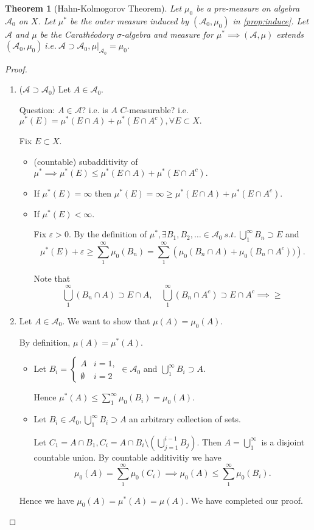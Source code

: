 \documentclass{report}
\newcommand{\st}{\ s.t.\ }
\newcommand{\ie}{\ i.e.\ }
\newtheorem{theorem}{Theorem}[chapter]
\theoremstyle{definition}
\theoremstyle{remark}
\begin{document}
\begin{theorem}[Hahn-Kolmogorov Theorem]
Let $\mu_0$ be a pre-measure on algebra $\mathcal{A}_0$ on $X$. Let $\mu^*$ be the outer measure induced by $(\mathcal{A}_0, \mu_0)$ in \ref{prop:induce}. Let $\mathcal{A}$ and $\mu$ be the Carathéodory $\sigma$-algebra and measure for $\mu^* \implies (\mathcal{A}, \mu)$ extends $(\mathcal{A}_0, \mu_0) \ie \mathcal{A} \supset \mathcal{A}_0, \mu|_{\mathcal{A}_0} = \mu_0.$ 
\end{theorem}
\begin{proof}
\begin{enumerate}
\item ($\mathcal{A} \supset \mathcal{A}_0$)
Let $A \in \mathcal{A}_0$. 

Question: $A \in \mathcal{A}$? i.e. is $A$ $C$-measurable? i.e. $\mu^*(E) = \mu^*(E \cap A) + \mu^*(E \cap A^c), \forall E \subset X.$

Fix $E \subset X.$
\begin{itemize}
\item (countable) subadditivity of $\mu^* \implies \mu^*(E) \leq \mu^*(E \cap A) + \mu^*(E \cap A^c).$
\item If $\mu^*(E) = \infty$ then $\mu^*(E) = \infty \geq \mu^*(E \cap A) + \mu^*(E \cap A^c).$
\item If $\mu^*(E) < \infty.$

Fix $\varepsilon > 0.$ By the definition of $\mu^*, \exists B_1, B_2, \ldots \in \mathcal{A}_0 \st \bigcup_1^\infty B_n \supset E$ and \[\mu^*(E) + \varepsilon \geq \sum_1^\infty \mu_0(B_n) = \sum_1^\infty \left(\mu_0(B_n \cap A) + \mu_0\left(B_n \cap A^c\right))\right).\]

Note that \[
\bigcup_1^\infty (B_n \cap A) \supset E \cap A, \quad \bigcup_1^\infty \left(B_n \cap A^c\right) \supset E \cap A^c \implies \geq
\]
\end{itemize}

\item
Let $A \in \mathcal{A}_0$. We want to show that $\mu(A) = \mu_0(A).$

By definition, $\mu(A) = \mu^*(A).$
\begin{itemize}
\item
Let $B_i = \begin{cases}
A & i = 1, \\
\emptyset & i = 2
\end{cases} \in \mathcal{A}_0$ and $\bigcup_{1}^\infty B_i \supset A.$

Hence $\mu^*(A) \leq \sum_1^\infty \mu_0(B_i) = \mu_0(A).$

\item
Let $B_i \in \mathcal{A}_0, \bigcup_{1}^\infty B_i \supset A$ an arbitrary collection of sets.

Let $C_1 = A \cap B_1, C_i = A \cap B_i \setminus \left(\bigcup_{j=1}^{i-1} B_j\right).$ Then $A = \bigcup_1^\infty$ is a disjoint countable union. By countable additivitiy we have
\[
\mu_0(A) = \sum_1^\infty \mu_0(C_i) \implies \mu_0(A) \leq \sum_1^\infty \mu_0(B_i).
\]
\end{itemize}
Hence we have $\mu_0(A) = \mu^*(A) = \mu(A)$. We have completed our proof. \qedhere
\end{enumerate}
\end{proof}
\end{document}
